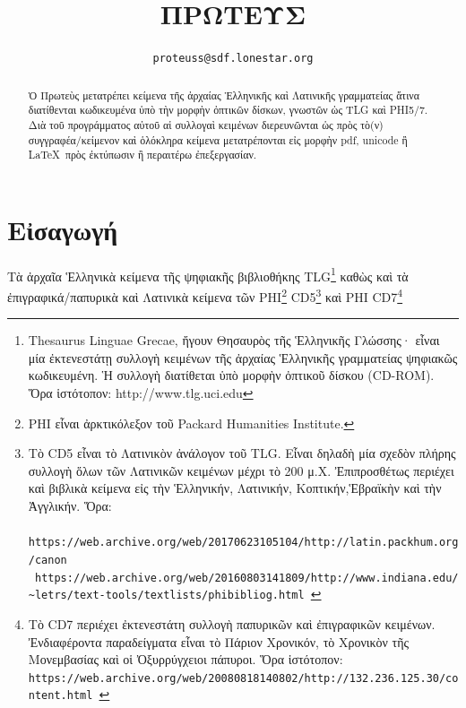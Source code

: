 \documentclass[12pt,a4paper]{article}
\title{ΠΡΩΤΕΥΣ}
\author{\tt {\small proteuss@sdf.lonestar.org}}
\date{\grtoday}
\begin{document}
  \maketitle
  \begin{abstract}
    \noindent
    Ὁ Πρωτεὺς μετατρέπει κείμενα τῆς ἀρχαίας Ἑλληνικῆς
    καὶ Λατινικῆς γραμματείας ἅτινα διατίθενται κωδικευμένα ὑπὸ τὴν μορφὴν
    ὀπτικῶν δίσκων, γνωστῶν ὡς TLG καὶ PHI5/7. Διὰ τοῦ προγράμματος αὐτοῦ
    αἱ συλλογαὶ κειμένων διερευνῶνται ὡς πρὸς τὸ(ν) συγγραφέα/κείμενον καὶ
    ὁλόκληρα κείμενα μετατρέπονται εἰς μορφὴν pdf, unicode ἢ \LaTeX\ πρὸς
    ἐκτύπωσιν ἢ περαιτέρω ἐπεξεργασίαν.
  \end{abstract}
  \tableofcontents
\section{Εἰσαγωγή}
  Τὰ ἀρχαῖα Ἑλληνικὰ κείμενα τῆς ψηφιακῆς βιβλιοθήκης
  TLG\footnote{Thesaurus Linguae Grecae, ἤγουν Θησαυρὸς
               τῆς Ἑλληνικῆς Γλώσσης· εἶναι μία ἐκτενεστάτῃ
               συλλογὴ κειμένων τῆς ἀρχαίας Ἑλληνικῆς
               γραμματείας ψηφιακῶς κωδικευμένη. Ἡ συλλογὴ
               διατίθεται ὑπὸ μορφὴν ὀπτικοῦ δίσκου (CD-ROM).
               Ὅρα ἱστότοπον: http://www.tlg.uci.edu}
  καθὼς καὶ τὰ ἐπιγραφικά/παπυρικὰ καὶ Λατινικὰ κείμενα τῶν
  PHI\footnote{PHI εἶναι ἀρκτικόλεξον τοῦ Packard Humanities Institute.}
  CD5\footnote{ Τὸ CD5 εἶναι τὸ Λατινικὸν ἀνάλογον τοῦ TLG.
                Εἶναι δηλαδὴ μία σχεδὸν πλήρης
                συλλογὴ ὅλων τῶν Λατινικῶν κειμένων μέχρι τὸ 200 μ.Χ.
                Ἐπιπροσθέτως περιέχει καὶ βιβλικὰ κείμενα εἰς τὴν
                Ἑλληνικήν, Λατινικήν, Κοπτικήν,Ἑβραϊκὴν καὶ τὴν
                Ἀγγλικήν. Ὅρα:\\
                  {\scriptsize\tt
                https://web.archive.org/web/20170623105104/http://latin.packhum.org/canon}\\
                  {\scriptsize\tt
                  https://web.archive.org/web/20160803141809/http://www.indiana.edu/
                \textasciitilde letrs/text-tools/textlists/phibibliog.html }
              }
  καὶ PHI CD7\footnote{Τὸ CD7 περιέχει ἐκτενεστάτη συλλογὴ παπυρικῶν καὶ
                    ἐπιγραφικῶν κειμένων. Ἐνδιαφέροντα παραδείγματα εἶναι
                    τὸ Πάριον Χρονικόν, τὸ Χρονικὸν τῆς Μονεμβασίας καὶ οἱ
                    Ὀξυρρύγχειοι πάπυροι. Ὅρα ἱστότοπον:\\
                       {\scriptsize\tt https://web.archive.org/web/20080818140802/http://132.236.125.30/content.html }}
\end{document}
